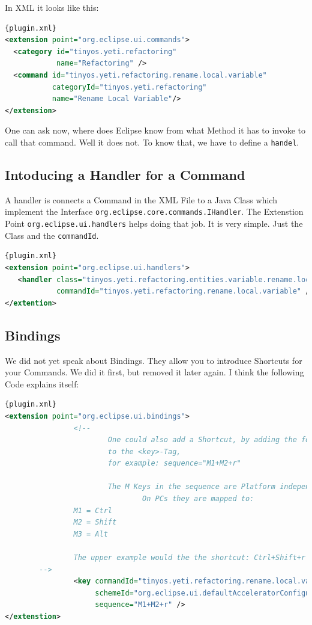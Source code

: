 \documentclass[a4paper,10pt]{report}
\begin{document}
In XML it looks like this:
\begin{lstlisting}[language=XML,caption=Createing a Command ({\it plugin.xml})]{plugin.xml}
<extension point="org.eclipse.ui.commands">
  <category id="tinyos.yeti.refactoring"
            name="Refactoring" />
  <command id="tinyos.yeti.refactoring.rename.local.variable"
           categoryId="tinyos.yeti.refactoring"
           name="Rename Local Variable"/>
</extension>
\end{lstlisting}

One can ask now, where does Eclipse know from what Method it has to invoke to call that command. Well it does not. To know that, we have to define a \verb!handel!.

\subsection{Intoducing a Handler for a Command}
A handler is connects a Command in the XML File to a Java Class which implement the Interface \verb!org.eclipse.core.commands.IHandler!. The Extenstion Point
\verb!org.eclipse.ui.handlers! helps doing that job. It is very simple. Just the Class and the \verb!commandId!.
\begin{lstlisting}[language=XML,caption=Connecting a Command to a Handler ({\it plugin.xml})]{plugin.xml}
<extension point="org.eclipse.ui.handlers">
   <handler class="tinyos.yeti.refactoring.entities.variable.rename.local.RenameLocalVariableActionHandler"
            commandId="tinyos.yeti.refactoring.rename.local.variable" />
</extention>
\end{lstlisting}

\subsection{Bindings}
We did not yet speak about Bindings. They allow you to introduce Shortcuts for your Commands. We did it first, but removed it later again.
I think the following Code explains itself:
\begin{lstlisting}[language=XML,caption=Introduce Shortcuts ({\it plugin.xml})]{plugin.xml}
<extension point="org.eclipse.ui.bindings">
                <!--
                        One could also add a Shortcut, by adding the following Attribute
                        to the <key>-Tag,
                        for example: sequence="M1+M2+r"

                        The M Keys in the sequence are Platform independent keys.
                                On PCs they are mapped to:
                M1 = Ctrl
                M2 = Shift
                M3 = Alt

                The upper example would the the shortcut: Ctrl+Shift+r
		-->
                <key commandId="tinyos.yeti.refactoring.rename.local.variable"
                     schemeId="org.eclipse.ui.defaultAcceleratorConfiguration"
                     sequence="M1+M2+r" />
</extenstion>
\end{lstlisting}
\end{document}
